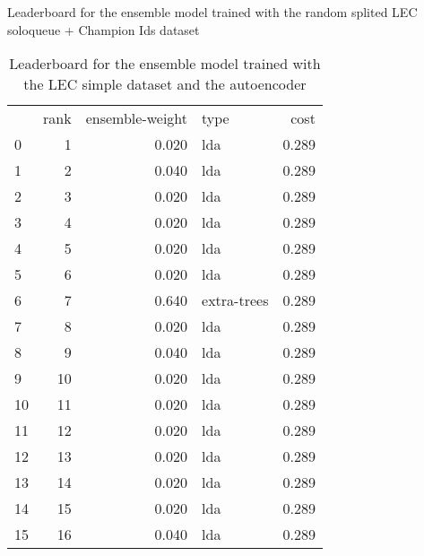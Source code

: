 \begin{table}[]
	\caption{Leaderboard for the ensemble model trained with the random splited LEC soloqueue + Champion Ids dataset}
	\label{tab:lb-lec-games-full-champid-randsplit}
\end{table}

\begin{table}[]
	\centering
	\begin{tabular}{lrrlr}
		   & rank & ensemble-weight & type        & cost  \\
		0  & 1    & 0.020           & lda         & 0.289 \\
		1  & 2    & 0.040           & lda         & 0.289 \\
		2  & 3    & 0.020           & lda         & 0.289 \\
		3  & 4    & 0.020           & lda         & 0.289 \\
		4  & 5    & 0.020           & lda         & 0.289 \\
		5  & 6    & 0.020           & lda         & 0.289 \\
		6  & 7    & 0.640           & extra-trees & 0.289 \\
		7  & 8    & 0.020           & lda         & 0.289 \\
		8  & 9    & 0.040           & lda         & 0.289 \\
		9  & 10   & 0.020           & lda         & 0.289 \\
		10 & 11   & 0.020           & lda         & 0.289 \\
		11 & 12   & 0.020           & lda         & 0.289 \\
		12 & 13   & 0.020           & lda         & 0.289 \\
		13 & 14   & 0.020           & lda         & 0.289 \\
		14 & 15   & 0.020           & lda         & 0.289 \\
		15 & 16   & 0.040           & lda         & 0.289 \\
	\end{tabular}

	\caption{Leaderboard for the ensemble model trained with the LEC simple dataset and the autoencoder}
	\label{tab:lb-lec-games-simple-autoencode}
\end{table}

